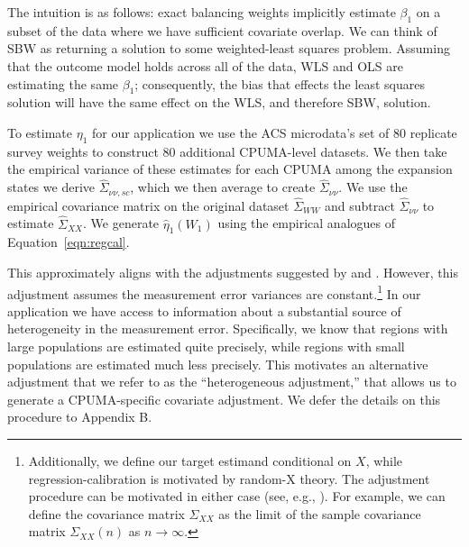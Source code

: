 \documentclass[aoas]{imsart}
\theoremstyle{plain}
\theoremstyle{remark}
\begin{document}
The intuition is as follows: exact balancing weights implicitly estimate $\beta_1$ on a subset of the data where we have sufficient covariate overlap. We can think of SBW as returning a solution to some weighted-least squares problem. Assuming that the outcome model holds across all of the data, WLS and OLS are estimating the same $\beta_1$; consequently, the bias that effects the least squares solution will have the same effect on the WLS, and therefore SBW, solution. 

To estimate $\eta_1$ for our application we use the ACS microdata's set of 80 replicate survey weights to construct 80 additional CPUMA-level datasets. We then take the empirical variance of these estimates for each CPUMA among the expansion states we derive $\hat{\Sigma}_{\nu\nu, sc}$, which we then average to create $\hat{\Sigma}_{\nu\nu}$. We use the empirical covariance matrix on the original dataset $\hat{\Sigma}_{WW}$ and subtract $\hat{\Sigma}_{\nu\nu}$ to estimate $\hat{\Sigma}_{XX}$. We generate $\hat{\eta}_1(W_1)$ using the empirical analogues of Equation~\ref{eqn:regcal}. 

This approximately aligns with the adjustments suggested by \cite{carroll2006measurement} and \cite{gleser1992importance}. However, this adjustment assumes the measurement error variances are constant.\footnote{Additionally, we define our target estimand conditional on $X$, while regression-calibration is motivated by random-X theory. The adjustment procedure can be motivated in either case (see, e.g., \cite{gleser1992importance}). For example, we can define the covariance matrix $\Sigma_{XX}$ as the limit of the sample covariance matrix $\Sigma_{XX}(n)$ as $n\to\infty$.} In our application we have access to information about a substantial source of heterogeneity in the measurement error. Specifically, we know that regions with large populations are estimated quite precisely, while regions with small populations are estimated much less precisely. This motivates an alternative adjustment that we refer to as the ``heterogeneous adjustment,'' that allows us to generate a CPUMA-specific covariate adjustment. We defer the details on this procedure to Appendix B.
\end{document}
